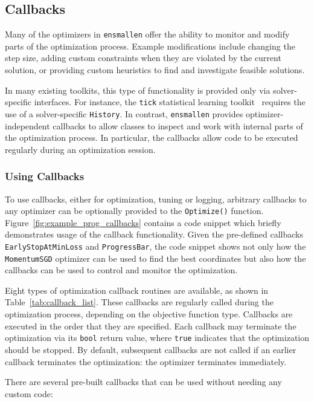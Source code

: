 \subsection{Callbacks}
\label{sec:callbacks}

Many of the optimizers in {\tt ensmallen} offer the ability to monitor
and modify parts of the optimization process.
Example modifications include changing the step size,
adding custom constraints when they are violated by the current solution,
or providing custom heuristics to find and investigate feasible solutions.

In many existing toolkits, this type of functionality is provided only via
solver-specific interfaces.  For instance, the {\tt tick} statistical learning
toolkit~\cite{bacry2017tick} requires the use of a solver-specific {\tt History}.
In contrast, {\tt ensmallen} provides optimizer-independent callbacks to allow
classes to inspect and work with internal parts of the optimization process.
In particular, the callbacks allow code to be
executed regularly during an optimization session.


\subsubsection{Using Callbacks}

To use callbacks, either for optimization, tuning or logging, 
arbitrary callbacks to any optimizer can be optionally provided
to the {\tt Optimize()} function.
Figure~\ref{fig:example_prog_callbacks} contains a code snippet which
briefly demonstrates usage of the callback functionality.  Given the pre-defined
callbacks {\tt EarlyStopAtMinLoss} and {\tt ProgressBar}, the code snippet shows
not only how the {\tt MomentumSGD} optimizer can be used to find the best
coordinates but also how the callbacks can be used to control and monitor the
optimization.

Eight types of optimization callback routines are available,
as shown in Table~\ref{tab:callback_list}.
These callbacks are regularly called during the optimization process,
depending on the objective function type.
Callbacks are executed in the order that they are specified.
Each callback may terminate the optimization via its {\tt bool} return value,
where {\tt true} indicates that the optimization should be stopped.
By default, subsequent callbacks are not called if an earlier callback terminates
the optimization: the optimizer terminates immediately.

There are several pre-built callbacks that can be used without
needing any custom code:

